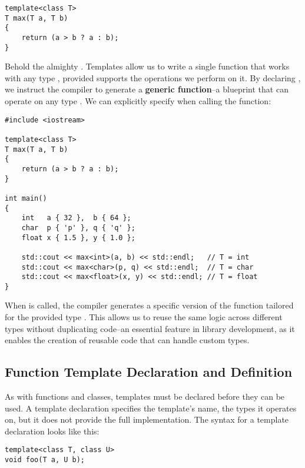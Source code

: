 \documentclass[12pt]{article}
\begin{document}
\begin{lstlisting}[style=cxx]
template<class T>
T max(T a, T b)
{
    return (a > b ? a : b);
}
\end{lstlisting}

\noindent
Behold the almighty .
Templates allow us to write a single function that works with any type , provided  supports the operations we perform on it.
By declaring , we instruct the compiler to generate a \textbf{generic function}--a blueprint that can operate on any type .
We can explicitly specify  when calling the function:

\begin{lstlisting}[style=cxx]
#include <iostream>

template<class T>
T max(T a, T b)
{
    return (a > b ? a : b);
}

int main()
{
    int   a { 32 },  b { 64 };
    char  p { 'p' }, q { 'q' };
    float x { 1.5 }, y { 1.0 };

    std::cout << max<int>(a, b) << std::endl;   // T = int
    std::cout << max<char>(p, q) << std::endl;  // T = char
    std::cout << max<float>(x, y) << std::endl; // T = float
}
\end{lstlisting}


\noindent
When  is called, the compiler generates a specific version of the function tailored for the provided type .
This allows us to reuse the same logic across different types without duplicating code--an essential feature in library development, as it enables the creation of reusable code that can handle custom types.

\subsection{Function Template Declaration and Definition}

\noindent
As with functions and classes, templates must be declared before they can be used.
A template declaration specifies the template's name, the types it operates on, but it does not provide the full implementation.
The syntax for a template declaration looks like this:

\begin{lstlisting}[style=cxx]
template<class T, class U>
void foo(T a, U b);
\end{lstlisting}
\end{document}
